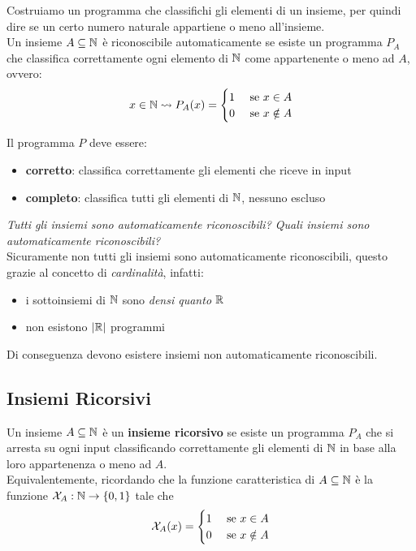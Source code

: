 Costruiamo un programma che classifichi gli elementi di un insieme, per quindi dire se un certo numero naturale appartiene o meno all'insieme.\\

Un insieme $A \subseteq \mathbb{N}$ è riconoscibile automaticamente se esiste un programma $P_A$ che classifica correttamente ogni elemento di $\mathbb{N}$ come appartenente o meno ad $A$, ovvero:
$$
x \in \mathbb{N} \rightsquigarrow P_A (x) = \begin{cases}
	1 & \text{ se } x \in A \\
	0 & \text{ se } x \notin A
\end{cases}
$$

Il programma $P$ deve essere:
\begin{itemize}
	\item \textbf{corretto}: classifica correttamente gli elementi che riceve in input
	\item \textbf{completo}: classifica  tutti gli elementi di $\mathbb{N}$, nessuno escluso
\end{itemize}

\textit{Tutti gli insiemi sono automaticamente riconoscibili? Quali insiemi sono automaticamente riconoscibili?} \\

Sicuramente non tutti gli insiemi sono automaticamente riconoscibili, questo grazie al concetto di \textit{cardinalità}, infatti: 
\begin{itemize}
	\item i sottoinsiemi di $\mathbb{N}$ sono \textit{densi quanto} $\mathbb{R}$ 
	\item non esistono $|\mathbb{R}|$ programmi
\end{itemize}
Di conseguenza devono esistere insiemi non automaticamente riconoscibili.\\

\subsection{Insiemi Ricorsivi}

Un insieme $A \subseteq \mathbb{N}$ è un \textbf{insieme ricorsivo} se esiste un programma $P_A$ che si arresta su ogni input classificando correttamente gli elementi di $\mathbb{N}$ in base alla loro appartenenza o meno ad $A$.\\

Equivalentemente, ricordando che la funzione caratteristica di $A \subseteq \mathbb{N}$ è la funzione $ \mathcal{X}_A : \mathbb{N} \rightarrow \{0,1\} $ tale che
$$
\mathcal{X}_A (x) = \begin{cases}
	1 & \text{ se } x \in A \\
	0 & \text{ se } x \notin A
\end{cases}
$$

